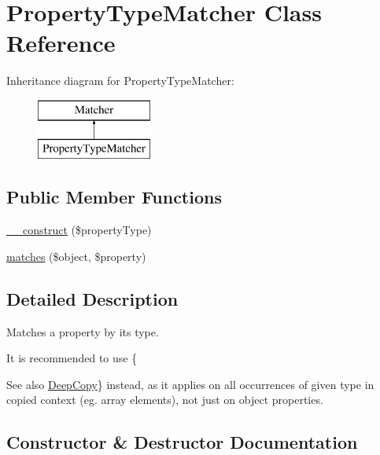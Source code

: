 \hypertarget{class_deep_copy_1_1_matcher_1_1_property_type_matcher}{}\section{Property\+Type\+Matcher Class Reference}
\label{class_deep_copy_1_1_matcher_1_1_property_type_matcher}
Inheritance diagram for Property\+Type\+Matcher\+:\begin{figure}[H]
\begin{center}
\leavevmode
\includegraphics[height=2.000000cm]{class_deep_copy_1_1_matcher_1_1_property_type_matcher}
\end{center}
\end{figure}
\subsection*{Public Member Functions}
\begin{DoxyCompactItemize}
\item 
\mbox{\hyperlink{class_deep_copy_1_1_matcher_1_1_property_type_matcher_a8301badd5a46b9a02fe2fa21d994902d}{\+\_\+\+\_\+construct}} (\$property\+Type)
\item 
\mbox{\hyperlink{class_deep_copy_1_1_matcher_1_1_property_type_matcher_a2e9fdbe8d1a508d5c5ee7c81d27d77ea}{matches}} (\$object, \$property)
\end{DoxyCompactItemize}


\subsection{Detailed Description}
Matches a property by its type.

It is recommended to use \{\begin{DoxySeeAlso}{See also}
\mbox{\hyperlink{class_deep_copy_1_1_deep_copy}{Deep\+Copy}}\} instead, as it applies on all occurrences of given type in copied context (eg. array elements), not just on object properties.
\end{DoxySeeAlso}


\subsection{Constructor \& Destructor Documentation}
\mbox{\label{class_deep_copy_1_1_matcher_1_1_property_type_matcher_a8301badd5a46b9a02fe2fa21d994902d}} 
